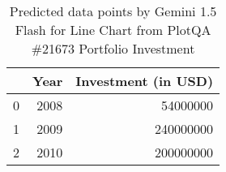 \begin{table}
    \begin{tabular}{lrr}
\toprule
 & Year & Investment (in USD) \\
\midrule
0 & 2008 & 54000000 \\
1 & 2009 & 240000000 \\
2 & 2010 & 200000000 \\
\bottomrule
\end{tabular}
     \caption{Predicted data points by Gemini 1.5 Flash for Line Chart from PlotQA \#21673 Portfolio Investment}
     \label{tab:plotqa-line-21673-gemini-flash}
     \end{table}
